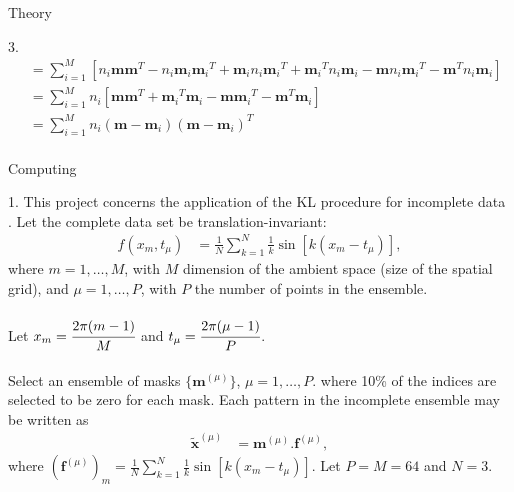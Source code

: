 \begin{section}{Theory}
\begin{homeworkSection}{3. }
{\begin{align*}
		&= \sum_{i=1}^M \left [ n_i \bm{m}\bm{m}^T - n_i \bm{m}_i {\bm{m}_i}^T + \bm{m}_i n_i {\bm{m}_i}^T + {\bm{m}_i}^T n_i {\bm{m}_i} - \bm{m} n_i {\bm{m}_i}^T - \bm{m}^T n_i {\bm{m}_i} \right ] \\
		&= \sum_{i=1}^M n_i \left [ \bm{m}\bm{m}^T + {\bm{m}_i}^T {\bm{m}_i} - \bm{m} {\bm{m}_i}^T - \bm{m}^T {\bm{m}_i} \right ] \\
		&= \sum_{i=1}^M n_i (\bm{m} - \bm{m}_i)(\bm{m} - \bm{m}_i)^T
		\\
	\end{align*}
}
\end{homeworkSection}

\end{section}

\begin{section}{Computing}

\begin{homeworkSection}{1. }
This project concerns the application of the KL procedure for incomplete data \cite{everson}. Let the complete data set be translation-invariant:
\begin{align*}
	f(x_m, t_\mu) &= \frac{1}{N} \sum_{k=1}^N \frac{1}{k} \sin[k(x_m-  t_\mu)],
\end{align*}
where $m = 1,\ldots, M$, with $M$ dimension of the ambient space (size of the spatial grid), and $\mu = 1,\ldots,P$, with $P$ the number of points in the ensemble. 
\\
\\
Let $x_m = \cfrac{2\pi(m-1)}{M}$ and $t_\mu = \cfrac{2\pi(\mu-1)}{P}$.
\\
\\
Select an ensemble of masks $\lbrace \bm{m}^{(\mu)} \rbrace$, $\mu = 1, \ldots, P$. where 10\% of the indices are selected to be zero for each mask. Each pattern in the incomplete ensemble may be written as
\begin{align*}
	\tilde{\bm{x}}^{(\mu)} &= \bm{m}^{(\mu)} . \bm{f}^{(\mu)},
\end{align*}
where $\left ( \bm{f}^{(\mu)} \right )_m = \frac{1}{N} \sum_{k=1}^N \frac{1}{k} \sin[k(x_m-  t_\mu)]$. Let $P=M=64$ and $N=3$.


\end{homeworkSection}
\end{section}
